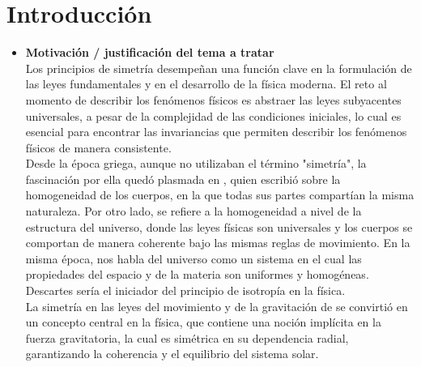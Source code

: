 \documentclass[11pt,a4paper,spanish]{book}
\begin{document}
\chapter{Introducción}
\begin{itemize}
\item \textbf{Motivación / justificación del tema a tratar}\\
Los principios de simetría desempeñan una función clave en la formulación de las leyes fundamentales y en el desarrollo de la física moderna. El reto al momento de describir los fenómenos físicos es abstraer las leyes subyacentes universales, a pesar de la complejidad de las condiciones iniciales, lo cual es esencial para encontrar las invariancias que permiten describir los fenómenos físicos de manera consistente\citep{gross1996}.\\
Desde la época griega, aunque no utilizaban el término "simetría", la fascinación por ella quedó plasmada en \cite{aristóteles1995}, quien escribió sobre la homogeneidad de los cuerpos, en la que todas sus partes compartían la misma naturaleza. Por otro lado, \cite{galileo1632} se refiere a la homogeneidad a nivel de la estructura del universo, donde las leyes físicas son universales y los cuerpos se comportan de manera coherente bajo las mismas reglas de movimiento. En la misma época, \cite{descartes1644} nos habla del universo como un sistema en el cual las propiedades del espacio y de la materia son uniformes y homogéneas. Descartes sería el iniciador del principio de isotropía en la física.\\
La simetría en las leyes del movimiento y de la gravitación de \cite{newton2018} se convirtió en un concepto central en la física, que contiene una noción implícita en la fuerza gravitatoria, la cual es simétrica en su dependencia radial, garantizando la coherencia y el equilibrio del sistema solar. \\

\end{itemize}
\end{document}
